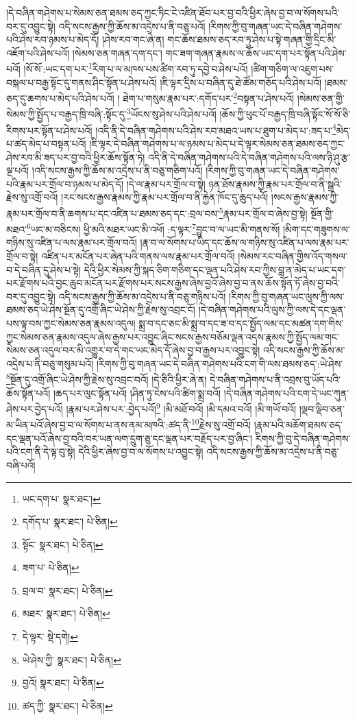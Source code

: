 །དེ་བཞིན་གཤེགས་པ་སེམས་ཅན་ཐམས་ཅད་ཀྱང་ཏིང་ངེ་འཛིན་ཐོབ་པར་བྱ་བའི་ཕྱིར་ཞེས་བྱ་བ་ལ་སོགས་པའི་བར་དུ་འབྱུང་སྟེ། འདི་སངས་རྒྱས་ཀྱི་ཆོས་མ་འདྲེས་པ་ནི་བཅུ་པའོ། །རིགས་ཀྱི་བུ་གཞན་ཡང་དེ་བཞིན་གཤེགས་པའི་ཤེས་རབ་ཉམས་པ་མེད་དོ། །ཤེས་རབ་གང་ཞེ་ན། གང་ཆོས་ཐམས་ཅད་རབ་ཏུ་ཤེས་པ་སྟེ་གཞན་གྱི་དྲིང་མི་འཇོག་པའི་ཤེས་པའོ། །སེམས་ཅན་གཞན་དག་དང་། གང་ཟག་གཞན་རྣམས་ལ་ཆོས་ཡང་དག་པར་སྟོན་པའི་ཤེས་པའོ། །སོ་སོ་:ཡང་དག་པར་\footnote{ཡང་དག་པ་  སྣར་ཐང་། }རིག་པ་ལ་མཁས་པས་ཚིག་རབ་ཏུ་དབྱེ་བ་ཤེས་པའོ། །ཚིག་གཅིག་ལ་འཇུག་པས་བསྐལ་པ་བརྒྱ་སྟོང་དུ་གནས་ཤིང་སྟོན་པ་ཤེས་པའོ། །ཇི་ལྟར་དྲིས་པ་བཞིན་དུ་ཐེ་ཚོམ་གཅོད་པའི་ཤེས་པའོ། །ཐམས་ཅད་དུ་ཆགས་པ་མེད་པའི་ཤེས་པའོ། །
ཐེག་པ་གསུམ་རྣམ་པར་:དགོད་པར་\footnote{དགོད་པ་  སྣར་ཐང་།  པེ་ཅིན། }བསྟན་པ་ཤེས་པའོ། །སེམས་ཅན་གྱི་སེམས་ཀྱི་སྤྱོད་པ་བརྒྱད་ཁྲི་བཞི་:སྟོང་དུ་\footnote{སྟོང་  སྣར་ཐང་།  པེ་ཅིན། }ཡོངས་སུ་ཤེས་པའི་ཤེས་པའོ། །ཆོས་ཀྱི་ཕུང་པོ་བརྒྱད་ཁྲི་བཞི་སྟོང་སོ་སོ་ཅི་རིགས་པར་སྟོན་པ་ཤེས་པའོ། །འདི་ནི་དེ་བཞིན་གཤེགས་པའི་ཤེས་རབ་མཐའ་ཡས་པ་ཐུག་པ་མེད་པ་:ཟད་པ་\footnote{ཟག་པ་  པེ་ཅིན། }མེད་པ་ཚད་མེད་པ་བསྟན་པའོ། །ཇི་ལྟར་དེ་བཞིན་གཤེགས་པ་ལ་ཉམས་པ་མེད་པ་དེ་ལྟར་སེམས་ཅན་ཐམས་ཅད་ཀྱང་ཤེས་རབ་མི་ཟད་པར་བྱ་བའི་ཕྱིར་ཆོས་སྟོན་ཏེ། འདི་ནི་དེ་བཞིན་གཤེགས་པའི་དེ་བཞིན་གཤེགས་པའི་ལས་ཉི་ཤུ་རྩ་ལྔ་པའོ། །འདི་སངས་རྒྱས་ཀྱི་ཆོས་མ་འདྲེས་པ་ནི་བཅུ་གཅིག་པའོ། །རིགས་ཀྱི་བུ་གཞན་ཡང་དེ་བཞིན་གཤེགས་པའི་རྣམ་པར་གྲོལ་བ་ཉམས་པ་མེད་དོ། །དེ་ལ་རྣམ་པར་གྲོལ་བ་སྟེ། ཉན་ཐོས་རྣམས་ཀྱི་རྣམ་པར་གྲོལ་བ་ནི་སྒྲའི་རྗེས་སུ་འགྲོ་བའོ། །རང་སངས་རྒྱས་རྣམས་ཀྱི་རྣམ་པར་གྲོལ་བ་ནི་རྐྱེན་ཁོང་དུ་ཆུད་པའོ། །སངས་རྒྱས་རྣམས་ཀྱི་རྣམ་པར་གྲོལ་བ་ནི་ཆགས་པ་དང་འཛིན་པ་ཐམས་ཅད་དང་:བྲལ་བས་\footnote{བྲལ་བ་  སྣར་ཐང་།  པེ་ཅིན། }རྣམ་པར་གྲོལ་བ་ཞེས་བྱ་སྟེ། སྔོན་གྱི་མཐའ་\footnote{མཐར་  སྣར་ཐང་།  པེ་ཅིན། }ཡང་མ་བཅིངས། ཕྱི་མའི་མཐར་ཡང་མི་འཕོ། :ད་ལྟར་\footnote{དེ་ལྟར་  སྡེ་དགེ། }བྱུང་བ་ལ་ཡང་མི་གནས་སོ། །མིག་དང་གཟུགས་ལ་གཉིས་སུ་འཛིན་པ་ལས་རྣམ་པར་གྲོལ་བའོ། །རྣ་བ་ལ་སོགས་པ་ཡིད་དང་ཆོས་ལ་གཉིས་སུ་འཛིན་པ་ལས་རྣམ་པར་གྲོལ་བ་སྟེ། འཛིན་པར་མངོན་པར་ཞེན་པའི་གནས་ལས་རྣམ་པར་གྲོལ་བའོ། །སེམས་རང་བཞིན་གྱིས་འོད་གསལ་བ་དེ་བཞིན་དུ་ཤེས་པ་སྟེ། དེའི་ཕྱིར་སེམས་ཀྱི་སྐད་ཅིག་གཅིག་དང་ལྡན་པའི་ཤེས་རབ་ཀྱིས་བླ་ན་མེད་པ་ཡང་དག་པར་རྫོགས་པའི་བྱང་ཆུབ་མངོན་པར་རྫོགས་པར་སངས་རྒྱས་ཞེས་བྱའོ་ཞེས་བྱ་བ་ནས་ཆོས་སྟོན་ཏོ་ཞེས་བྱ་བའི་བར་དུ་འབྱུང་སྟེ། འདི་སངས་རྒྱས་ཀྱི་ཆོས་མ་འདྲེས་པ་ནི་བཅུ་གཉིས་པའོ། །རིགས་ཀྱི་བུ་གཞན་ཡང་ལུས་ཀྱི་ལས་ཐམས་ཅད་ཡེ་ཤེས་སྔོན་དུ་འགྲོ་ཞིང་ཡེ་ཤེས་ཀྱི་རྗེས་སུ་འབྲང་ངོ། །དེ་བཞིན་གཤེགས་པའི་ལུས་ཀྱི་ལས་དེ་དང་ལྡན་པས་ལྟ་བས་ཀྱང་སེམས་ཅན་རྣམས་འདུལ། སྨྲ་བ་དང་ཅང་མི་སྨྲ་བ་དང་ཟ་བ་དང་སྤྱོད་ལམ་དང་མཚན་དག་གིས་ཀྱང་སེམས་ཅན་རྣམས་འདུལ་ཞེས་རྒྱས་པར་འབྱུང་ཞིང་སངས་རྒྱས་བཅོམ་ལྡན་འདས་རྣམས་ཀྱི་སྤྱོད་ལམ་གང་སེམས་ཅན་འདུལ་བར་མི་འགྱུར་བ་དེ་གང་ཡང་མེད་དོ་ཞེས་བྱ་བ་རྒྱས་པར་འབྱུང་སྟེ། འདི་སངས་རྒྱས་ཀྱི་ཆོས་མ་འདྲེས་པ་ནི་བཅུ་གསུམ་པའོ། །རིགས་ཀྱི་བུ་གཞན་ཡང་དེ་བཞིན་གཤེགས་པའི་ངག་གི་ལས་ཐམས་ཅད་:ཡེ་ཤེས་\footnote{ཡེ་ཤེས་ཀྱི་  སྣར་ཐང་།  པེ་ཅིན། }སྔོན་དུ་འགྲོ་ཞིང་ཡེ་ཤེས་ཀྱི་རྗེས་སུ་འབྲང་བའོ། །དེ་ཅིའི་ཕྱིར་ཞེ་ན། དེ་བཞིན་གཤེགས་པ་ནི་འབྲས་བུ་ཡོད་པའི་ཆོས་སྟོན་པའོ། །ཆད་པར་ལུང་སྟོན་པའོ། །ཤིན་ཏུ་ངེས་པའི་ཚིག་སྨྲ་བའོ། །དེ་བཞིན་གཤེགས་པའི་ངག་དེ་ཡང་ཀུན་ཤེས་པར་བྱེད་པའོ། །རྣམ་པར་ཤེས་པར་:བྱེད་པའོ།\footnote{བྱའོ།  སྣར་ཐང་།  པེ་ཅིན། } །མི་མཐོ་བའོ། །མི་དམའ་བའོ། །མི་གཡོ་བའོ། །ལྡབ་ལྡིབ་ཅན་མ་ཡིན་པའོ་ཞེས་བྱ་བ་ལ་སོགས་པ་ནས་ནམ་མཁའི་:ཚད་ནི་\footnote{ཚད་ཀྱི་  སྣར་ཐང་།  པེ་ཅིན། }རྗེས་སུ་འགྲོ་བའོ། །རྣམ་པའི་མཆོག་ཐམས་ཅད་དང་ལྡན་པའོ་ཞེས་བྱ་བའི་བར་ཡན་ལག་དྲུག་ཅུ་དང་ལྡན་པར་བརྗོད་པར་བྱ་ཞིང་། རིགས་ཀྱི་བུ་དེ་བཞིན་གཤེགས་པའི་ངག་ནི་དེ་ལྟ་བུ་སྟེ། དེའི་ཕྱིར་ཞེས་བྱ་བ་ལ་སོགས་པ་འབྱུང་སྟེ། འདི་སངས་རྒྱས་ཀྱི་ཆོས་མ་འདྲེས་པ་ནི་བཅུ་བཞི་པའོ། 